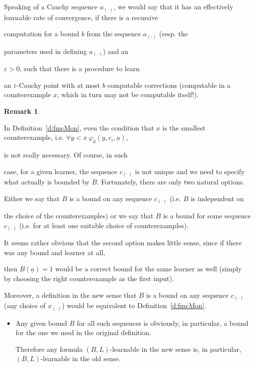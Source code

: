 \documentclass[1p]{elsarticle}
\newcommand{\tup}{\underline} %
\theoremstyle{plain}
\theoremstyle{definition}
\newtheorem{rmk}[thm]{Remark}
\theoremstyle{remark}
\renewcommand{\phi}{\varphi}
\renewcommand{\epsilon}{\varepsilon}
\theoremstyle{definition}
\begin{document}
Speaking of a Cauchy sequence $a_{(\cdot)}$, we would say that it has an effectively learnable rate of convergence, if there is a recursive 

computation for a bound $b$ from the sequence $a_{(\cdot)}$ (resp. the 

parameters used in defining $a_{(\cdot)}$) and an  

$\epsilon >0$, such that there is a procedure to learn 

an $\epsilon$-Cauchy point with at most $b$ computable corrections (computable in a counterexample $x$, which in turn may not be computable itself!).

\begin{rmk}\label{r:smallestCE}

In Definition~\ref{d:fmcMon}, even the condition that $x$ is the smallest counterexample, i.e. $\forall y<x\ \phi_0(y,c_i,\tup a)$, 

is not really necessary. Of course, in such

case, for a given learner, the sequence $c_{(\cdot)}$ is not unique and we need to specify what actually is bounded by $B$. Fortunately, there are only two natural options.

 Either we say that $B$ is a bound on any sequence $c_{(\cdot)}$ (i.e. $B$ is independent on

the choice of the counterexamples) or we say that $B$ is a bound for some sequence $c_{(\cdot)}$ (i.e. for at least one suitable choice of counterexamples). 

It seems rather obvious that the second option makes little sense, since if there was any bound and learner at all, 

then $B(\tup a)=1$ would be a correct bound for the same learner as well (simply by choosing the right counterexample as the first input).

Moreover, a definition in the new sense that $B$ is a bound on any sequence $c_{(\cdot)}$ (any choice of $x_{(\cdot)}$) would be equivalent to Definition~\ref{d:fmcMon}.

\begin{itemize} 

\item Any given bound $B$ for all such sequences is obviously, in particular, a bound for the one we used in the original definition. 

Therefore any formula $(B,L)$-learnable in the new sense is, in particular, $(B,L)$-learnable in the old sense.


\end{itemize}
\end{rmk}
\end{document}
